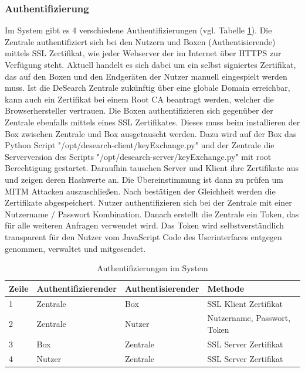 \subsubsection{Authentifizierung} \label{cap:authentifizierung}
Im System gibt es 4 verschiedene Authentifizierungen (vgl. Tabelle \ref{tab:authentifizierungen}).\newline
Die Zentrale authentifiziert sich bei den Nutzern und Boxen (Authentisierende) mittels SSL Zertifikat, wie jeder Webserver der im Internet über HTTPS zur Verfügung steht. Aktuell handelt es sich dabei um ein selbst signiertes Zertifikat, das auf den Boxen und den Endgeräten der Nutzer manuell eingespielt werden muss. Ist die DeSearch Zentrale zukünftig über eine globale Domain erreichbar, kann auch ein Zertifikat bei einem Root CA beantragt werden, welcher die Browserhersteller vertrauen. \newline
Die Boxen authentifizieren sich gegenüber der Zentrale ebenfalls mittels eines SSL Zertifikates.
Dieses muss beim installieren der Box zwischen Zentrale und Box ausgetauscht werden. Dazu wird auf der Box das Python Script "/opt/desearch-client/keyExchange.py" und der Zentrale die Serverversion des Scripts "/opt/desearch-server/keyExchange.py" mit root Berechtigung gestartet. Daraufhin tauschen Server und Klient ihre Zertifikate aus und zeigen deren Hashwerte an. Die Übereinstimmung ist dann zu prüfen um MITM Attacken auszuschließen. Nach bestätigen der Gleichheit werden die Zertifikate abgespeichert. \newline
Nutzer authentifizieren sich bei der Zentrale mit einer Nutzername / Passwort Kombination. Danach erstellt die Zentrale ein Token, das für alle weiteren Anfragen verwendet wird. Das Token wird selbstverständlich transparent für den Nutzer vom JavaScript Code des Userinterfaces entgegen genommen, verwaltet und mitgesendet.

\begin{table}[h]
	\begin{tabular}{ | l | l | l | l |}
		\hline
		\textbf{Zeile} & \textbf{Authentifizierender} & \textbf{Authentisierender} &  \textbf{Methode} \\ \hline
		1 & Zentrale & Box      & SSL Klient Zertifikat \\ \hline
		2 & Zentrale & Nutzer   & Nutzername, Passwort, Token \\ \hline
		3 & Box      & Zentrale & SSL Server Zertifikat \\ \hline
		4 & Nutzer   & Zentrale & SSL Server Zertifikat \\ \hline
		
	\end{tabular}
	\caption{Authentifizierungen im System}
	\label{tab:authentifizierungen}
\end{table}

